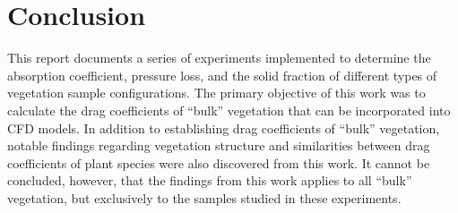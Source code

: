 \documentclass[12pt]{article}
\begin{document}




\pagebreak

\section*{Conclusion}
This report documents a series of experiments implemented to determine the absorption coefficient, pressure loss, and the solid fraction of different types of vegetation sample configurations. The primary objective of this work was to calculate the drag coefficients of ``bulk'' vegetation that can be incorporated into CFD models. In addition to establishing drag coefficients of ``bulk''  vegetation, notable findings regarding vegetation structure and similarities between drag coefficients of plant species were also discovered from this work. It cannot be concluded, however, that the findings from this work applies to all ``bulk'' vegetation, but exclusively to the samples studied in these experiments.
\end{document}
